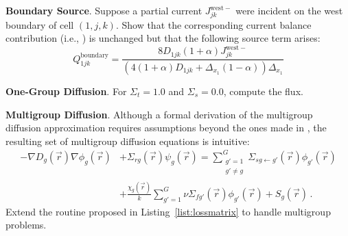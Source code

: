 \begin{exercises}
 \item \textbf{Boundary Source}.  Suppose a partial current 
   $J^{\mathrm{west}-}_{jk}$ were incident on the west boundary 
   of cell $(1, j, k)$.  Show that the corresponding current 
   balance contribution (i.e., ) is unchanged 
   but that the following source term arises:
  \begin{equation}
  Q^{\mathrm{boundary}}_{1jk} = \frac{8 D_{1jk} (1+\alpha) J^{\mathrm{west}-}_{jk}}
                                    {(4(1+\alpha)D_{1jk} + \Delta_{x_1}(1-\alpha))\Delta_{x_1}} 
  \end{equation}
 
  \item \textbf{One-Group Diffusion}.  For $\Sigma_t = 1.0$ and 
  $\Sigma_s = 0.0$, compute the flux.
  
  \item \textbf{Multigroup Diffusion}. 
    Although a formal derivation of the multigroup diffusion approximation
    requires assumptions beyond the ones
    made in ,
    the resulting set of multigroup diffusion equations is intuitive:
    \begin{equation}
    \begin{split}
      -\nabla D_g(\vec{r}) \nabla \phi_g(\vec{r}) &+ 
        \Sigma_{rg}(\vec{r})  \psi_g(\vec{r})  = 
        \sum_{\substack{g'=1 \\ g'\neq g}}^{G} 
          \Sigma_{sg \gets g'}(\vec{r}) \phi_{g'}(\vec{r})  \\
        &+  \frac{\chi_g(\vec{r})}{ k}  
              \sum_{g'=1}^{G} 
                \nu\Sigma_{fg'}(\vec{r}) 
                  \phi_{g'}(\vec{r})
        +  S_g(\vec{r})  \, .
    \end{split}
    \label{eq:multigroupneutrondiffusionequation}
    \end{equation}
    Extend the routine proposed in Listing~\ref{list:lossmatrix} to handle 
    multigroup problems.
  
  
\end{exercises}
